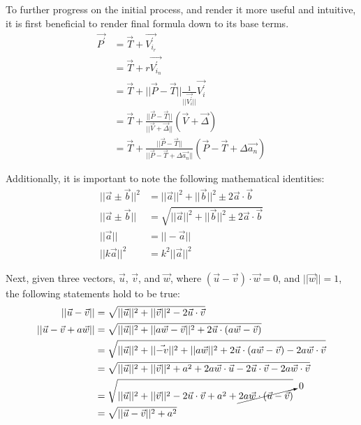 To further progress on the initial process, and render it more useful and intuitive, it is first beneficial to render final formula down to its base terms.
\begin{align}
    {\vec{P^\prime}} &= \vec{T} + \vec{V^\prime_{i_r}}\nonumber\\
    &= \vec{T} + r\vec{V^\prime_{i_n}}\nonumber\\
    &= \vec{T} + ||\vec{P} - \vec{T}||\frac{1}{||\vec{V^\prime_i}||}\vec{V^\prime_i}\nonumber\\
    &= \vec{T} + \frac{||\vec{P} - \vec{T}||}{||\vec{V} + \vec{\Delta}||}(\vec{V} + \vec{\Delta})\nonumber\\
    &= \vec{T} + \frac{||\vec{P} - \vec{T}||}{||\vec{P} - \vec{T} + \Delta\vec{a_n}||}(\vec{P} - \vec{T} + \Delta\vec{a_n})
\end{align}

Additionally, it is important to note the following mathematical identities:
\begin{align*}
    ||\vec{a} \pm \vec{b}||^2 &= ||\vec{a}||^2 + ||\vec{b}||^2 \pm 2\vec{a}\cdot\vec{b}\\
    ||\vec{a} \pm \vec{b}|| &= \sqrt{||\vec{a}||^2 + ||\vec{b}||^2 \pm 2\vec{a}\cdot\vec{b}}\\
    ||\vec{a}|| &= ||-\vec{a}||\\
    ||k\vec{a}||^2 &= k^2||\vec{a}||^2
\end{align*}

Next, given three vectors, $\vec{u}$, $\vec{v}$, and $\vec{w}$, where $(\vec{u}-\vec{v})\cdot\vec{w} = 0$, and $||\vec{w}|| = 1$, the following statements hold to be true:
\begin{align}
    ||\vec{u} - \vec{v}|| &= \sqrt{||\vec{u}||^2 + ||\vec{v}||^2 - 2\vec{u}\cdot\vec{v}}\\
    ||\vec{u} - \vec{v} + a\vec{w}|| &= \sqrt{||\vec{u}||^2 + ||a\vec{w} - \vec{v}||^2 + 2\vec{u}\cdot(a\vec{w} - \vec{v})}\nonumber\\
    &= \sqrt{||\vec{u}||^2 + ||\vec{-v}||^2 + ||a\vec{w}||^2 + 2\vec{u}\cdot(a\vec{w}-\vec{v}) - 2a\vec{w}\cdot\vec{v}}\nonumber\\
    &= \sqrt{||\vec{u}||^2 + ||\vec{v}||^2 + a^2 + 2a\vec{w}\cdot\vec{u}-2\vec{u}\cdot\vec{v} - 2a\vec{w}\cdot\vec{v}}\nonumber\\
    &= \sqrt{||\vec{u}||^2 + ||\vec{v}||^2 - 2\vec{u}\cdot\vec{v} + a^2 + \cancelto{0}{2a\vec{w}\cdot(\vec{u}-\vec{v})}}\nonumber\\
    &= \sqrt{||\vec{u} - \vec{v}||^2 + a^2} \label{uvaw}
\end{align}


